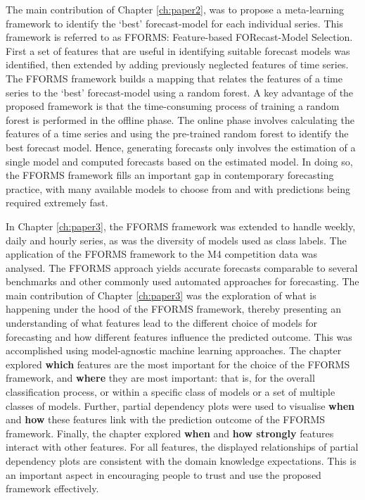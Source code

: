 \documentclass{monashthesis}
\begin{document}
The main contribution of Chapter \ref{ch:paper2}, was to propose a meta-learning framework to identify the `best' forecast-model for each individual series. This framework is referred to as FFORMS: Feature-based FORecast-Model Selection. First a set of features that are useful in identifying suitable forecast models was identified, then extended by adding previously neglected features of time series.
The FFORMS framework builds a mapping that relates the features of a time series to the `best' forecast-model using a random forest. A key advantage of the proposed framework is that the time-consuming process of training a random forest is performed in the offline phase. The online phase involves calculating the features of a time series and using the pre-trained random forest to identify the best forecast model. Hence, generating forecasts only involves the estimation of a single model and computed forecasts based on the estimated model. In doing so, the FFORMS framework fills an important gap in contemporary forecasting practice, with many available models to choose from and with predictions being required extremely fast.

In Chapter \ref{ch:paper3}, the FFORMS framework was extended to handle weekly, daily and hourly series, as was the diversity of models used as class labels. The application of the FFORMS framework to the M4 competition data was analysed. The FFORMS approach yields accurate forecasts comparable to several benchmarks and other commonly used automated approaches for forecasting. The main contribution of Chapter \ref{ch:paper3} was the exploration of what is happening under the hood of the FFORMS framework, thereby presenting an understanding of what features lead to the different choice of models for forecasting and how different features influence the predicted outcome. This was accomplished using model-agnostic machine learning approaches. The chapter explored \textbf{which} features are the most important for the choice of the FFORMS framework, and \textbf{where} they are most important: that is, for the overall classification process, or within a specific class of models or a set of multiple classes of models. Further, partial dependency plots were used to visualise \textbf{when} and \textbf{how} these features link with the prediction outcome of the FFORMS framework. Finally, the chapter explored \textbf{when} and \textbf{how strongly} features interact with other features. For all features, the displayed relationships of partial dependency plots are consistent with the domain knowledge expectations. This is an important aspect in encouraging people to trust and use the proposed framework effectively.
\end{document}
